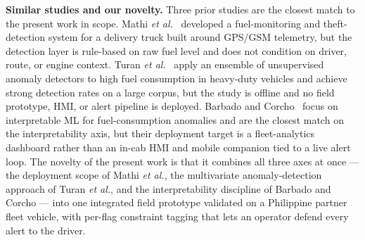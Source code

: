 \documentclass[10pt,journal]{IEEEtran}
\begin{document}
\textbf{Similar studies and our novelty.} Three prior studies are the closest match to the present work in scope. Mathi \textit{et al.}~\cite{mathi2024development} developed a fuel-monitoring and theft-detection system for a delivery truck built around GPS/GSM telemetry, but the detection layer is rule-based on raw fuel level and does not condition on driver, route, or engine context. Turan \textit{et al.}~\cite{turan2024detecting} apply an ensemble of unsupervised anomaly detectors to high fuel consumption in heavy-duty vehicles and achieve strong detection rates on a large corpus, but the study is offline and no field prototype, HMI, or alert pipeline is deployed. Barbado and Corcho~\cite{barbado2022interpretable} focus on interpretable ML for fuel-consumption anomalies and are the closest match on the interpretability axis, but their deployment target is a fleet-analytics dashboard rather than an in-cab HMI and mobile companion tied to a live alert loop. The novelty of the present work is that it combines all three axes at once --- the deployment scope of Mathi \textit{et al.}, the multivariate anomaly-detection approach of Turan \textit{et al.}, and the interpretability discipline of Barbado and Corcho --- into one integrated field prototype validated on a Philippine partner fleet vehicle, with per-flag constraint tagging that lets an operator defend every alert to the driver.
\end{document}
